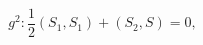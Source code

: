 \begin{equation}
g^{2}:\frac{1}{2}\left( S_{1},S_{1}\right) +\left( S_{2},S\right) =0,
\label{bf54}
\end{equation}

